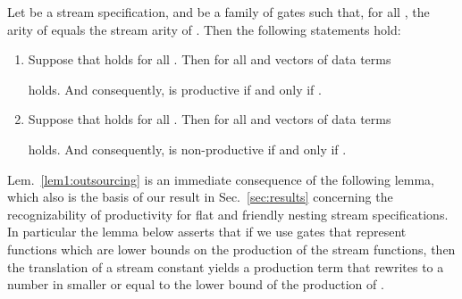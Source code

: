 \begin{lemma}
  \label{lem1:outsourcing}
Let  be a stream specification, and
   be a family of gates
  such that, for all\/ , the arity of\/ 
  equals the stream arity of\/ .
  Then the following statements hold:
\begin{enumerate}
    \renewcommand{\labelenumi}{(\roman{enumi})}
\item\label{lem1:outsourcing:item:1}
      Suppose that\/ 
      holds for all\/ .
Then for all\/  
      and vectors  
      of data terms

      holds.                   
And consequently,  is \daobly{} productive
      if and only if\/ .
\vspace*{0.75ex}
\item\label{lem1:outsourcing:item:2}
      Suppose that\/ 
      holds for all\/ .
Then for all\/  
      and vectors  
      of data terms 

      holds.          
And consequently,  is \daobly{} non-productive
      if and only if\/ .
\end{enumerate}
\end{lemma}
Lem.~\ref{lem1:outsourcing} is an immediate consequence of the following lemma,
which also is the basis of our result in Sec.~\ref{sec:results} 
concerning the recognizability of productivity for flat and friendly nesting
stream specifications. 
In particular the lemma below asserts that if we use gates that
represent \pein{} functions which are lower bounds 
on the production of the stream functions,
then the translation of a stream constant 
yields a production term that rewrites to a number in 
smaller or equal to the \daob{} lower bound of the production of .


